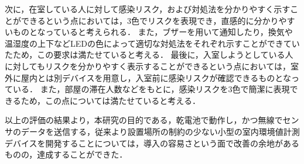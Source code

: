 次に，在室している人に対して感染リスク，および対処法を分かりやすく示すことができるという点においては，3色でリスクを表現でき，直感的に分かりやすいものとなっていると考えられる．
また，ブザーを用いて通知したり，換気や温湿度の上下などLEDの色によって適切な対処法をそれぞれ示すことができていたため，この要求は満たせていると考える．
最後に，入室しようとしている人に対してもリスクを分かりやすく表示することができるという点においては，室外に屋内とは別デバイスを用意し，入室前に感染リスクが確認できるものとなっている．
また，部屋の滞在人数などをもとに，感染リスクを3色で簡潔に表現できるため，この点については満たせていると考える．

以上の評価の結果より，本研究の目的である，乾電池で動作し，かつ無線でセンサのデータを送信する，従来より設置場所の制約の少ない小型の室内環境値計測デバイスを開発することについては，導入の容易さという面で改善の余地があるものの，達成することができた．




